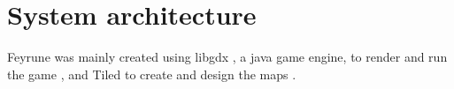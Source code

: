 \section{System architecture}
\begin{comment}
	The most overall, top level description of your application. If your application
	uses multiple components (such as servers, databases, etc.), describe their
	responsibilities here and show how they are dependent on each other and how they
	communicate (which protocols etc.)

	You will to describe the `flow' of the application at a high level. What happens
	if the application is started (and later stopped) and what the normal flow of
	operation is. Relate this to the different components (if any) in your
	application.
\end{comment}
Feyrune was mainly created using libgdx , a java game engine, to render and run the game \cite{libgdx}, and Tiled to create and design the maps \cite{tiled}.
